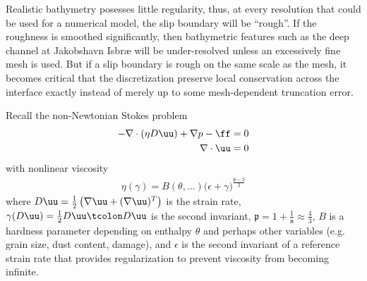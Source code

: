 Realistic bathymetry posesses little regularity, thus, at every resolution that could be used for a numerical model, the slip boundary will be ``rough''.
If the roughness is smoothed significantly, then bathymetric features such as the deep channel at Jakobshavn Isbr{\ae} will be under-resolved unless an excessively fine mesh is used.
But if a slip boundary is rough on the same scale as the mesh, it becomes critical that the discretization preserve local conservation across the interface exactly instead of merely up to some mesh-dependent truncation error.

Recall the non-Newtonian Stokes problem
\begin{align}\label{eq:slip:stokes-strong}
    -\nabla \cdot(\eta D\uu) + \nabla p - \ff &= 0 \\
    \nabla \cdot \uu &= 0
\end{align}
with nonlinear viscosity
\begin{gather}
  \eta(\gamma) = B(\theta,\dotsc)\big(\epsilon + \gamma \big)^{\frac{\mathfrak{p}-2}{2}}
\end{gather}
where $D\uu = \tfrac 1 2 \left(\nabla \uu + (\nabla \uu)^T \right)$ is the strain rate, $\gamma(D\uu) = \tfrac 1 2 D\uu \tcolon D\uu$ is the second invariant, $\mathfrak{p} = 1 + \tfrac{1}{\mathfrak{n}} \approx \tfrac 4 3$, $B$ is a hardness parameter depending on enthalpy $\theta$ and perhaps other variables (e.g. grain size, dust content, damage), and $\epsilon$ is the second invariant of a reference strain rate that provides regularization to prevent viscosity from becoming infinite.

